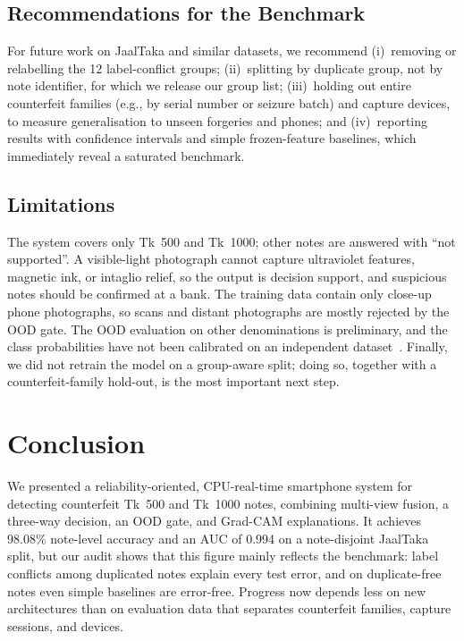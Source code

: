 \documentclass[journal]{IEEEtran}
\begin{document}
\subsection{Recommendations for the Benchmark}
For future work on JaalTaka and similar datasets, we recommend (i)~removing or
relabelling the 12 label-conflict groups; (ii)~splitting by duplicate group, not by
note identifier, for which we release our group list; (iii)~holding out entire
counterfeit families (e.g., by serial number or seizure batch) and capture devices, to
measure generalisation to unseen forgeries and phones; and (iv)~reporting results with
confidence intervals and simple frozen-feature baselines, which immediately reveal a
saturated benchmark.

\subsection{Limitations}
The system covers only Tk~500 and Tk~1000; other notes are answered with ``not
supported''. A visible-light photograph cannot capture ultraviolet features, magnetic
ink, or intaglio relief, so the output is decision support, and suspicious notes should
be confirmed at a bank. The training data contain only close-up phone photographs, so
scans and distant photographs are mostly rejected by the OOD gate. The OOD evaluation on other
denominations is preliminary, and the class probabilities have not been calibrated on
an independent dataset~\cite{guo2017calibration}. Finally, we did not retrain the model
on a group-aware split; doing so, together with a counterfeit-family hold-out, is the
most important next step.

\section{Conclusion}
\label{sec:conclusion}

We presented a reliability-oriented, CPU-real-time smartphone system for detecting
counterfeit Tk~500 and Tk~1000 notes, combining multi-view fusion, a three-way decision,
an OOD gate, and Grad-CAM explanations. It achieves 98.08\% note-level accuracy and an
AUC of 0.994 on a note-disjoint JaalTaka split, but our audit shows that this figure
mainly reflects the benchmark: label conflicts among duplicated notes explain every
test error, and on duplicate-free notes even simple baselines are error-free. Progress
now depends less on new architectures than on evaluation data that separates
counterfeit families, capture sessions, and devices.
\end{document}
